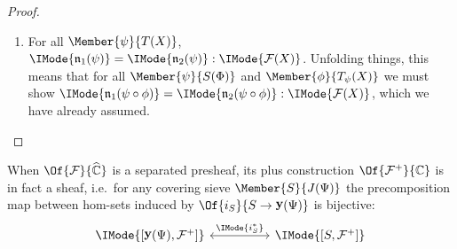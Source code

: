 \documentclass{article}
\DeclareMathOperator\OpYoneda{\mathbf{y}}
\newcommand\Yoneda[1]{\OpYoneda({#1})}
\newcommand\Psh[1]{\widehat{#1}}
\newcommand\Plus[1]{{#1}^+}
\newcommand\IsEqOf[3]{\IMode{#1}=\IMode{#2}:\IMode{#3}}
\begin{document}
\begin{proof}
\begin{enumerate}
  \item For all $\Member{\psi}{T(X)}$,
    $\IsEqOf{\mathfrak{n}_1(\psi)}{\mathfrak{n}_2(\psi)}{\mathcal{F}(X)}$. Unfolding
    things, this means that for all $\Member{\psi}{S(\Phi)}$ and
    $\Member{\phi}{T_\psi(X)}$ we must show
    $\IsEqOf{\mathfrak{n}_1(\psi\circ\phi)}{\mathfrak{n}_2(\psi\circ\phi)}{\mathcal{F}(X)}$,
    which we have already assumed.
  \end{enumerate}

\end{proof}


\begin{thm}\label{thm:plus-sheaf}
  When $\Of{\mathcal{F}}{\Psh{\mathbb{C}}}$ is a separated presheaf, its plus
  construction $\Of{\Plus{\mathcal{F}}}{\mathbb{C}}$ is in fact a sheaf, i.e.\
  for any covering sieve $\Member{S}{J(\Psi)}$ the precomposition map
  between hom-sets induced by $\Of{i_S}{S\to\Yoneda{\Psi}}$ is
  bijective:
  \[
    \begin{tikzcd}[sep=huge]
      \IMode{[\Yoneda{\Psi},\Plus{\mathcal{F}}]}
      \arrow[r,leftrightarrow,"\IMode{i_S^*}"]
      &
      \IMode{[S,\Plus{\mathcal{F}}]}
    \end{tikzcd}
  \]
\end{thm}
\end{document}
